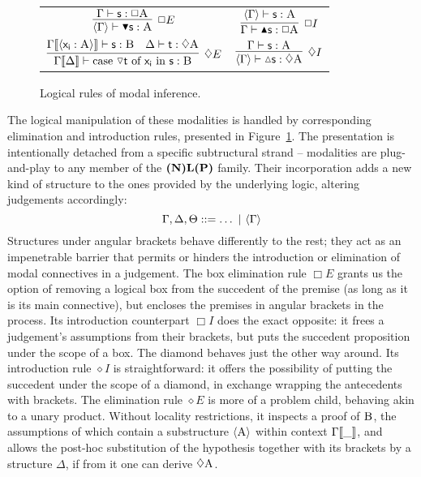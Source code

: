 \begin{figure}
	\centering
	\begin{tabularx}{0.9875\textwidth}{@{}CC@{}}
		$\infer[\Box E]{\bracket{\Gamma} \vdash \boxelim{\term{s}}: \prop{A}}{
			\Gamma \vdash \term{s}: \Box\prop{A}
		}$
		&
		$\infer[\Box I]{\Gamma \vdash \boxintro{\term{s}}:\Box\prop{A}}{
			\bracket{\Gamma} \vdash \term{s}:\prop{A}
		}$
		\\[\smallsep]
		$\infer[\diamond E]{\Gamma\ctx{\Delta} \vdash \cterm{case \term{\diaelim t} of \term{x_i} in \term{s}}: \prop{B}}{
			\Gamma\ctx{\bracket{\term{x_i}:\prop{A}}}\vdash\term{s}:\prop{B}
			&
			\Delta \vdash \term{t}:\diamond\prop{A}
		}
		$
		&
		$\infer[\diamond I]{\bracket{\Gamma} \vdash \diaintro{\term{s}}: \diamond \prop{A}}{
			\Gamma \vdash \term{s}:\prop{A}
		}$
	\end{tabularx}
	\caption{Logical rules of modal inference.}
	\label{figure:modal_logical}
\end{figure}

The logical manipulation of these modalities is handled by corresponding elimination and introduction rules, presented in Figure~\ref{figure:modal_logical}.
The presentation is intentionally detached from a specific subtructural strand -- modalities are plug-and-play to any member of the $\textbf{(N)L(P)}$ family.
Their incorporation adds a new kind of structure to the ones provided by the underlying logic, altering judgements accordingly:
\[
	\Gamma, \Delta, \Theta ::= \dots \ | \ \bracket{\Gamma}
\]
Structures under angular brackets behave differently to the rest; they act as an impenetrable barrier that permits or hinders the introduction or elimination of modal connectives in a judgement.
The box elimination rule $\Box E$ grants us the option of removing a logical box from the succedent of the premise (as long as it is its main connective), but encloses the premises in angular brackets in the process.
Its introduction counterpart $\Box I$ does the exact opposite: it frees a judgement's assumptions from their brackets, but puts the succedent proposition under the scope of a box.
The diamond behaves just the other way around.
Its introduction rule $\diamond I$ is straightforward: it offers the possibility of putting the succedent under the scope of a diamond, in exchange wrapping the antecedents with brackets.
The elimination rule $\diamond E$ is more of a problem child, behaving akin to a unary product.
Without locality restrictions, it inspects a proof of $\smallprop{B}$, the assumptions of which contain a substructure $\bracket{\smallprop{A}}$ within context $\Gamma{\llbracket{\_}\rrbracket}$, and allows the post-hoc substitution of the hypothesis together with its brackets by a structure $\Delta$, if from it one can derive $\diamond \smallprop{A}$.

